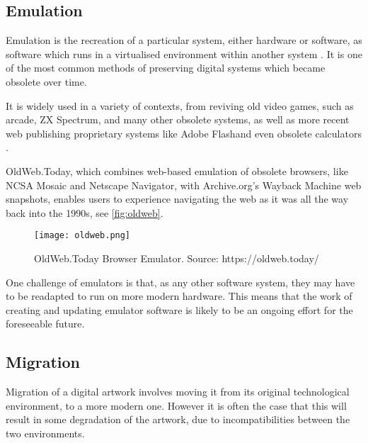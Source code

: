 \subsection{Emulation}

Emulation is the recreation of a particular system, either hardware or software, as software which runs in a virtualised environment within another system \cite{rothenbergUsingEmulationPreserve2000}. It is one of the most common methods of preserving digital systems which became obsolete over time.

It is widely used in a variety of contexts, from reviving old video games, such as arcade\footnotemark[1], ZX Spectrum\footnotemark[2], and many other obsolete systems\footnotemark[3], as well as more recent web publishing proprietary systems like Adobe Flash\footnotemark[4] and even obsolete calculators \cite{scottjasonCalculatedMoveCalculators2023}.


OldWeb.Today, which combines web-based \gls{emulation} of obsolete browsers, like NCSA Mosaic and Netscape Navigator, with Archive.org's Wayback Machine web snapshots, enables users to experience navigating the web as it was all the way back into the 1990s, see \autoref{fig:oldweb}.

\begin{figure}[h]
    \centering
    \captionsetup{justification=centering}
    \texttt{[image: oldweb.png]}
    \caption[OldWeb.Today Browser Emulator]{OldWeb.Today Browser Emulator. Source: https://oldweb.today/ }
    \label{fig:oldweb}
\end{figure}

One challenge of emulators is that, as any other software system, they may have to be readapted to run on more modern hardware. This means that the work of creating and updating emulator software is likely to be an ongoing effort for the foreseeable future.

\subsection{Migration}

Migration of a digital artwork involves moving it from its original technological environment, to a more modern one. However it is often the case that this will result in some degradation of the artwork, due to incompatibilities between the two environments. \cite{huberNewMediaOld2013}

